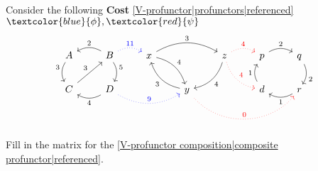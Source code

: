 
Consider the following \textbf{Cost} \ref{V-profunctor|profunctors|referenced} $\textcolor{blue}{\phi},\textcolor{red}{\psi}$ \[
      \begin{tikzcd}[ampersand replacement=\&]
        A \arrow[d, "3"', bend right] \& B \arrow[l, "2"', bend right] \arrow[d, "5", bend left] \arrow[r, "11", blue, dotted, bend left] \& x \arrow[rr, "3", bend left] \arrow[rd, "4", bend left] \&                                                                      \& z \arrow[ld, "4", bend left] \arrow[r, "4", red,dotted, bend left] \arrow[rd, red, "4", dotted, bend right] \& p \arrow[r, "2", bend left] \& q \arrow[d, "2", bend left] \\
        C \arrow[ru, "3"]             \& D \arrow[l, "4", bend left] \arrow[rr, blue, "9", dotted, bend right]                            \&                                                         \& y \arrow[lu, "3", bend left] \arrow[rrr, red, "0", dotted, bend right=49] \&                                                                                                    \& d \arrow[u, "1", bend left] \& r \arrow[l, "1", bend left]
      \end{tikzcd}
    \]

    Fill in the matrix for the \ref{V-profunctor composition|composite profunctor|referenced}.